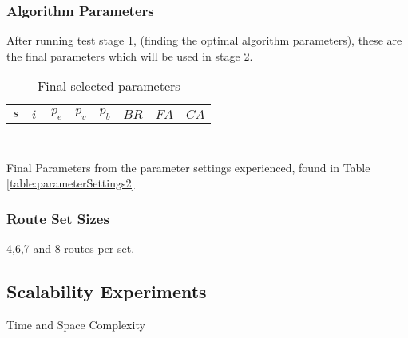 \subsubsection{Algorithm Parameters}
After running test stage 1, (finding the optimal algorithm parameters), these are the final parameters which will be used in stage 2.

\begin{table}[H]
	\centering
    \begin{tabular}{|l|l|l|l|l|l|l|l|}
 	\hline
 	$s$ & $i$ & $p_{e}$ & $p_{v}$ & $p_{b}$ & $BR$ & $FA$ & $CA$  \\
 	\hline
    ~ & ~ & ~ & ~ & ~ & ~ & ~ & ~ \\
	\hline
    \end{tabular}
    \caption {Final selected parameters}
    Final Parameters from the parameter settings experienced, found in Table \vref{table:parameterSettings2}
    \label{table:finalParameters}
	\end{table}

\subsubsection{Route Set Sizes}
4,6,7 and 8 routes per set.

\subsection{Scalability Experiments}
Time and Space Complexity

